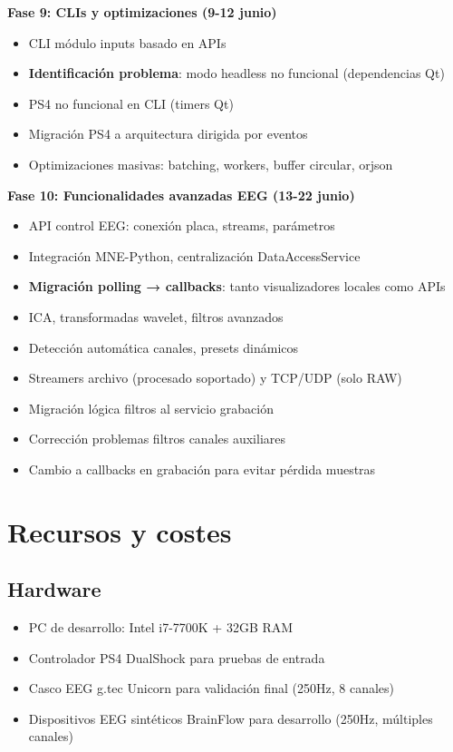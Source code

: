 \textbf{Fase 9: CLIs y optimizaciones (9-12 junio)}
\begin{itemize}
    \item CLI módulo inputs basado en APIs
    \item \textbf{Identificación problema}: modo headless no funcional (dependencias Qt)
    \item PS4 no funcional en CLI (timers Qt)
    \item Migración PS4 a arquitectura dirigida por eventos
    \item Optimizaciones masivas: batching, workers, buffer circular, orjson
\end{itemize}

\textbf{Fase 10: Funcionalidades avanzadas EEG (13-22 junio)}
\begin{itemize}
    \item API control EEG: conexión placa, streams, parámetros
    \item Integración MNE-Python, centralización DataAccessService
    \item \textbf{Migración polling → callbacks}: tanto visualizadores locales como APIs
    \item ICA, transformadas wavelet, filtros avanzados
    \item Detección automática canales, presets dinámicos
    \item Streamers archivo (procesado soportado) y TCP/UDP (solo RAW)
    \item Migración lógica filtros al servicio grabación
    \item Corrección problemas filtros canales auxiliares
    \item Cambio a callbacks en grabación para evitar pérdida muestras
\end{itemize}

\section{Recursos y costes}

\subsection{Hardware}
\begin{itemize}
    \item PC de desarrollo: Intel i7-7700K + 32GB RAM
    \item Controlador PS4 DualShock para pruebas de entrada
    \item Casco EEG g.tec Unicorn para validación final (250Hz, 8 canales)
    \item Dispositivos EEG sintéticos BrainFlow para desarrollo (250Hz, múltiples canales)
\end{itemize}

